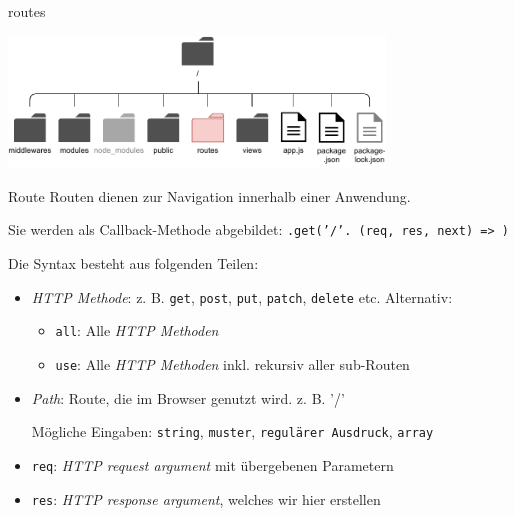 \begin{bonus}{routes}
    \begin{center}
        \includegraphics[width=0.75\textwidth]{includes/figures/bonus_nodejs_routes.pdf}
    \end{center}
\end{bonus}

\begin{defi}{Route}
    Routen dienen zur Navigation innerhalb einer Anwendung.

    Sie werden als Callback-Methode abgebildet:
    \texttt{.get('/'. (req, res, next) => {})}

    Die Syntax besteht aus folgenden Teilen:
    \begin{itemize}
        \item \emph{HTTP Methode}: z. B. \texttt{get}, \texttt{post}, \texttt{put}, \texttt{patch}, \texttt{delete} etc.
              Alternativ:
              \begin{itemize}
                  \item \texttt{all}: Alle \emph{HTTP Methoden}
                  \item \texttt{use}: Alle \emph{HTTP Methoden} inkl. rekursiv aller sub-Routen
              \end{itemize}
        \item \emph{Path}: Route, die im Browser genutzt wird. z. B. '/'

              Mögliche Eingaben: \texttt{string}, \texttt{muster}, \texttt{regulärer Ausdruck}, \texttt{array}
        \item \texttt{req}: \emph{HTTP request argument} mit übergebenen Parametern
        \item \texttt{res}: \emph{HTTP response argument}, welches wir hier erstellen


\end{itemize}
\end{defi}
